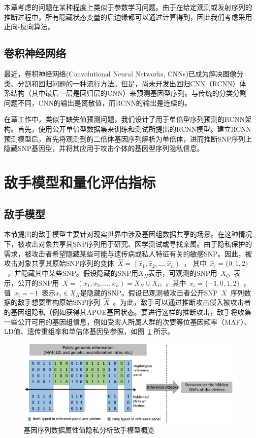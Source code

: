 本章考虑的问题在某种程度上类似于参数学习问题。由于在给定观测或发射序列的推断过程中，所有隐藏状态变量的后边缘都可以通过计算得到，因此我们考虑采用正向-反向算法。

\subsection{卷积神经网络}

最近，卷积神经网络(Convolutional Neural Networks, CNNs)\cite{long2017fully,scutti2018what}已成为解决图像分类、分割和回归问题的一种流行方法。但是，尚未开发出回归CNN（RCNN）体系结构（其中最后一层是回归层的CNN）来预测基因型序列。与传统的分类分割问题不同，CNN的输出是离散值\cite{scutti2018what}，而RCNN的输出是连续的。

在章工作中，类似于缺失值预测问题，我们设计了用于单倍型序列预测的RCNN架构。首先，使用公开单倍型数据集来训练和测试所提出的RCNN模型。建立RCNN预测模型后，首先将观测到的二倍体基因序列解析为单倍体，进而推断SNP序列上隐藏SNP基因型，并将其应用于攻击个体的基因型序列隐私信息。


\section{敌手模型和量化评估指标}\label{sec:adver}

\subsection{敌手模型}

本节提出的敌手模型主要针对现实世界中涉及基因组数据共享的场景。在这种情况下，被攻击对象共享其SNP序列用于研究、医学测试或寻找亲属。由于隐私保护的需求，被攻击者希望隐藏某些可能与遗传病或私人特征有关的敏感SNP。因此，被攻击对象共享其原始SNP序列的变体~$\hat{X}=(\hat{x}_1,\hat{x}_2, ... , \hat{x}_n)$~， 其中~$\hat{x}_i =\{0,1,2\}$~，并隐藏其中某些SNP。假设隐藏的SNP用$X_H$表示，可观测的SNP用~$X_O$~表示，公开的SNP用~$X=(x_1, x_2, ..., x_n)=X_H \cup X_O$~，其中~$x_i =\{-1,0,1,2\}$~，值~$x_i=-1$~表示$x_i\in X_H$是隐藏的SNP。假设已观测被攻击者公开SNP~$X$~序列数据的敌手想要重构原始SNP序列~$\hat{X}$~。为此，敌手可以通过推断攻击侵入被攻击者的基因组隐私（例如获得其APOE基因状态\cite{nyholt2009jim}。要进行这样的推断攻击，敌手将收集一些公开可用的基因组信息\cite{IGSR2019,howie2014impute2}，例如受害人所属人群的次要等位基因频率（MAF）、LD值、遗传重组率和单倍体基因型参照，如图~\ref{fig:adversary-model} 所示。

\begin{figure}[htbp]
	\centering
	\includegraphics[width = 0.95\linewidth]{./figures/Fig2-adversary-model.eps}
	\caption{基因序列数据属性值隐私分析敌手模型概览}
	\label{fig:adversary-model}
\end{figure}

